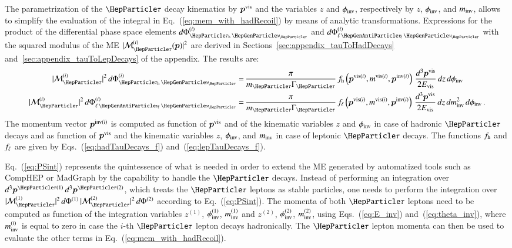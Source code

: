 %

The parametrization of the $\Pgt$ decay kinematics by $\bm{p}^{\textrm{vis}}$
and the variables $z$ and $\phi_{\textrm{inv}}$, respectively by $z$, $\phi_{\textrm{inv}}$, and $m_{\textrm{inv}}$,
allows to simplify the evaluation of the integral in Eq.~(\ref{eq:mem_with_hadRecoil}) by means of analytic transformations.
Expressions for the product of the differential phase space elements
$d\Phi^{(i)}_{\tauhnu}$  and $d\Phi^{(i)}_{\ellnunu}$ with the squared
modulus of the ME $\vert \mathcal{M}^{(i)}_{\Pgt}(\bm{p}) \vert^{2}$ are derived in Sections~\ref{sec:appendix_tauToHadDecays} and~\ref{sec:appendix_tauToLepDecays} of the appendix.
The results are:
\begin{align}
\vert \mathcal{M}^{(i)}_{\Pgt} \vert^{2} \, d\Phi^{(i)}_{\tauhnu} 
 = & \, \frac{\pi}{m_{\Pgt}\Gamma_{\Pgt}} \,
 f_{\Phadron}\left(\bm{p}^{\vis(i)}, m^{\vis(i)},
   \bm{p}^{\inv(i)}\right) \, \frac{d^{3}\bm{p}^{\vis}}{2 E_{\vis}} \, dz \, d\phi_{\inv} \nonumber \\
\vert \mathcal{M}^{(i)}_{\Pgt} \vert^{2} \, d\Phi^{(i)}_{\ellnunu} 
 = & \, \frac{\pi}{m_{\Pgt}\Gamma_{\Pgt}} \, f_{\ell}\left(\bm{p}^{\vis(i)},
 m^{\vis(i)}, \bm{p}^{\inv(i)}\right) \, \frac{d^{3}\bm{p}^{\vis}}{2 E_{\vis}} \, dz \, dm^{2}_{\inv} \, d\phi_{\inv}
 \, .
\label{eq:PSint}
\end{align}
The momentum vector $\bm{p}^{\textrm{inv}(i)}$ is computed as function of
$\bm{p}^{\textrm{vis}}$ and of the kinematic variables $z$ and $\phi_{\textrm{inv}}$
in case of hadronic $\Pgt$ decays and as function of $\bm{p}^{\textrm{vis}}$
and the kinematic variables $z$, $\phi_{\textrm{inv}}$, and $m_{\textrm{inv}}$ in case
of leptonic $\Pgt$ decays.
The functions $f_{\textrm{h}}$ and $f_{\ell}$ are given by
Eqs.~(\ref{eq:hadTauDecays_f})
and~(\ref{eq:lepTauDecays_f}).

Eq.~(\ref{eq:PSint}) represents the quintessence of what is needed 
in order to extend the ME generated by automatized tools such as
CompHEP or MadGraph
by the capability to handle the $\Pgt$ decays.
Instead of performing an integration over $d^{3}\bm{p}^{\Pgt(1)} \,
d^{3}\bm{p}^{\Pgt(2)}$, which treats the $\Pgt$ leptons as stable particles,
one needs to perform the integration over $\vert
\mathcal{M}^{(1)}_{\Pgt} \vert^{2} \, d\Phi^{(1)} \, \vert
\mathcal{M}^{(2)}_{\Pgt} \vert^{2} \, d\Phi^{(2)}$ according to
Eq.~(\ref{eq:PSint}).
The momenta of both $\Pgt$ leptons need to be computed as
function of the integration variables $z^{(1)}$, $\phi_{\textrm{inv}}^{(1)}$,
$m_{\textrm{inv}}^{(1)}$ and $z^{(2)}$, $\phi_{\textrm{inv}}^{(2)}$,
$m_{\textrm{inv}}^{(2)}$, using Eqs.~(\ref{eq:E_inv})
and~(\ref{eq:theta_inv}),
where $m_{\textrm{inv}}^{(i)}$ is equal to zero in case the $i$-th $\Pgt$ lepton
decays hadronically.
The $\Pgt$ lepton momenta can then be used to evaluate the other
terms in Eq.~(\ref{eq:mem_with_hadRecoil}).

